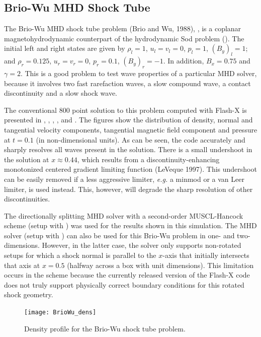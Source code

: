 \subsection{Brio-Wu MHD Shock Tube}
\label{Sec:SimulationBrioWu}

The Brio-Wu MHD shock tube problem (Brio and Wu, 1988),
, is a
coplanar magnetohydrodynamic counterpart of the hydrodynamic Sod
problem (). The initial left
and right states are given by $\rho_l=1$, $u_l=v_l=0$, $p_l=1$,
$(B_y)_l=1$; and $\rho_r=0.125$, $u_r=v_r=0$, $p_r=0.1$,
$(B_y)_r=-1$. In addition, $B_x=0.75$ and $\gamma=2$. This is a good
problem to test wave properties of a particular MHD solver, because
it involves two fast rarefaction waves, a slow compound wave, a
contact discontinuity and a slow shock wave.

The conventional 800 point solution to this problem computed with
Flash-X is presented in ,
, ,
, and  . The figures show the
distribution of density, normal and tangential velocity components,
tangential magnetic field component and pressure at $t=0.1$ (in
non-dimensional units). As can be seen, the code accurately and
sharply resolves all waves present in the solution. There is a small
undershoot in the solution at $x\approx0.44$, which results from a
discontinuity-enhancing monotonized centered gradient limiting
function (LeVeque 1997). This undershoot can be easily removed if a
less aggressive limiter, {\it e.g.} a minmod or a van Leer limiter,
is used instead. This, however, will degrade the sharp resolution of
other discontinuities.

The directionally splitting  MHD solver
with a second-order MUSCL-Hancock scheme (setup with ) was used 
for the results shown in this simulation.
The  MHD solver (setup with ) can also be used
for this Brio-Wu problem in one- and two-dimensions.
However, in the latter case, the 
solver only supports non-rotated setups for which
a shock normal is parallel to the $x$-axis that
initially intersects that axis
at $x=0.5$ (halfway across a box with unit dimensions).
This limitation occurs in the 
scheme because the currently released version of
the Flash-X code does not truly support physically
correct boundary conditions for this rotated shock
geometry.


\begin{figure}[!ht]
\begin{center}
{\leavevmode\texttt{[image: BrioWu\_dens]}}
\end{center}
\caption{\label{Fig:bw_density} Density profile for the
Brio-Wu shock tube problem. }
\end{figure}

